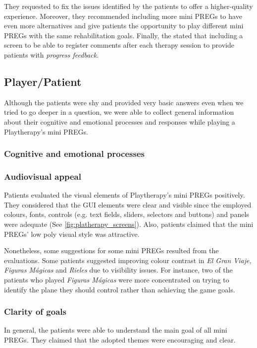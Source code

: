 They requested to fix the issues identified by the patients to offer a higher-quality experience. Moreover, they recommended including more mini \acp{PREG} to have even more alternatives and give patients the opportunity to play different mini \acp{PREG} with the same rehabilitation goals. Finally, the stated that including a screen to be able to register comments after each therapy session to provide patients with \textit{progress feedback}.

\subsection{Player/Patient}
Although the patients were shy and provided very basic answers even when we tried to go deeper in a question, we were able to collect general information about their cognitive and emotional processes and responses while playing a Playtherapy's mini \acp{PREG}.

\subsubsection{Cognitive and emotional processes}
\subsubsection*{Audiovisual appeal}
Patients evaluated the visual elements of Playtherapy's mini \acp{PREG} positively. They considered that the \ac{GUI} elements were clear and visible since the employed colours, fonts, controls (e.g. text fields, sliders, selectors and buttons) and panels were adequate (See \autoref{fig:platherapy_screens}). Also, patients claimed that the mini \acp{PREG}' low poly visual style was attractive.

Nonetheless, some suggestions for some mini \acp{PREG} resulted from the evaluations. Some patients suggested improving colour contrast in \textit{El Gran Viaje}, \textit{Figuras M\'agicas} and \textit{Rieles} due to visibility issues. For instance, two of the patients who played \textit{Figuras M\'agicas} were more concentrated on trying to identify the plane they should control rather than achieving the game goals.

\subsubsection*{Clarity of goals}
In general, the patients were able to understand the main goal of all mini \acp{PREG}. They claimed that the adopted themes were encouraging and clear.

